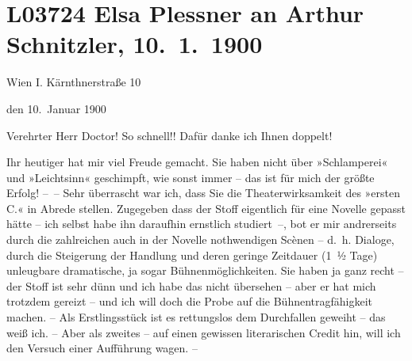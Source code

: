 

\section[Elsa Plessner an Arthur Schnitzler, 10. 1. 1900]{L03724 Elsa Plessner an Arthur Schnitzler, 10. 1. 1900}
\nopagebreak{}
\rehead{ }\normalsize\beginnumbering{}
\toendnotes[C]{\smallbreak\pagebreak[2]}
\toendnotes[C]{\smallbreak}
\toendnotes[C]{\smallbreak}
\pstart
           {\pb}Wien I. Kärnthnerstraße 10\pend
           
\pstart
           \raggedleft{}den 10. Januar 1900\pend
           
\pstart{}Verehrter Herr Doctor!\pend\vspace{0.5em}
\pstart
           So schnell!! Dafür danke ich Ihnen doppelt!\pend
           
\pstart
           Ihr heutiger{ }\label{K_L03724-1v}\label{K_L03724-1} hat mir viel Freude gemacht. Sie
               haben nicht über »Schlamperei« und »Leichtsinn« geschimpft, wie sonst immer – das ist
               für mich der größte Erfolg! – – Sehr überrascht war ich, dass Sie die
               Theaterwirksamkeit des »ersten
                  C.« in Abrede stellen. Zugegeben dass der Stoff eigentlich für eine Novelle
               gepasst hätte – ich selbst habe ihn darauf{\pb}hin
               ernstlich studiert –, bot er mir andrerseits durch die zahlreichen auch in der
               Novelle nothwendigen Scènen – d. h. Dialoge, durch die Steigerung der Handlung und
               deren geringe Zeitdauer (1 ½ Tage) unleugbare dramatische, ja sogar
               Bühnenmöglichkeiten. Sie haben ja ganz recht – der Stoff ist sehr dünn und ich habe
               das nicht übersehen – aber er hat mich trotzdem gereizt – und ich will doch die Probe
               auf die Bühnentragfähigkeit machen. – Als Erstlingsstück ist es rettungslos dem
               Durchfallen geweiht – das weiß ich. – Aber als zweites – auf einen {\pb}gewissen literarischen Credit hin, will ich den Versuch
               einer Aufführung wagen. –\pend
           
